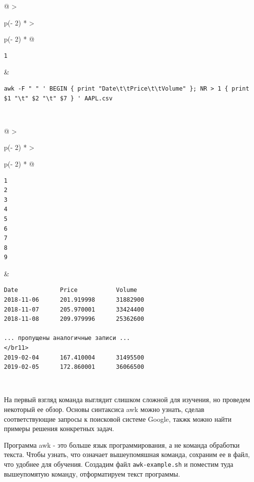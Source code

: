 \documentclass{article}
\begin{document}
\begin{longtable}[]{@{}
  >{\raggedright\arraybackslash}p{(\columnwidth - 2\tabcolsep) * }
  >{\raggedright\arraybackslash}p{(\columnwidth - 2\tabcolsep) * }@{}}
\toprule
\endhead
\begin{minipage}[t]{\linewidth}\raggedright
\begin{verbatim}
1
\end{verbatim}
\end{minipage} & \begin{minipage}[t]{\linewidth}\raggedright
\begin{verbatim}
awk -F " " ' BEGIN { print "Date\t\tPrice\t\tVolume" }; NR > 1 { print $1 "\t" $2 "\t" $7 } ' AAPL.csv
\end{verbatim}
\end{minipage} \\ \addlinespace
\bottomrule
\end{longtable}

\begin{longtable}[]{@{}
  >{\raggedright\arraybackslash}p{(\columnwidth - 2\tabcolsep) * }
  >{\raggedright\arraybackslash}p{(\columnwidth - 2\tabcolsep) * }@{}}
\toprule
\endhead
\begin{minipage}[t]{\linewidth}\raggedright
\begin{verbatim}
1
2
3
4
5
6
7
8
9
\end{verbatim}
\end{minipage} & \begin{minipage}[t]{\linewidth}\raggedright
\begin{verbatim}
Date            Price           Volume
2018-11-06      201.919998      31882900
2018-11-07      205.970001      33424400
2018-11-08      209.979996      25362600

... пропущены аналогичные записи ...
</br11>
2019-02-04      167.410004      31495500
2019-02-05      172.860001      36066500
\end{verbatim}
\end{minipage} \\ \addlinespace
\bottomrule
\end{longtable}

На первый взгляд команда выглядит слишком сложной для изучения, но
проведем некоторый ее обзор. Основы синтаксиса awk можно узнать, сделав
соответствующие запросы к поисковой системе Google, такжк можно найти
примеры решения конкретных задач.

Программа awk - это больше язык программирования, а не команда обработки
текста. Чтобы узнать, что означает вышеупомяшная команда, сохраним ее в
файл, что удобнее для обучения. Создадим файл \texttt{awk-example.sh} и
поместим туда вышеупомятую команду, отформатируем текст программы.
\end{document}
